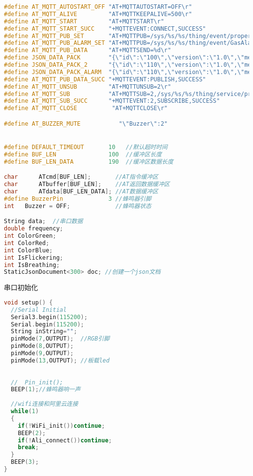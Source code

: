 \documentclass[12pt,hyperref,a4paper,UTF8]{ctexart}
\begin{document}
\begin{lstlisting}[language=C++]
#define AT_MQTT_AUTOSTART_OFF "AT+MQTTAUTOSTART=OFF\r"
#define AT_MQTT_ALIVE         "AT+MQTTKEEPALIVE=500\r"
#define AT_MQTT_START         "AT+MQTTSTART\r"
#define AT_MQTT_START_SUCC    "+MQTTEVENT:CONNECT,SUCCESS"
#define AT_MQTT_PUB_SET       "AT+MQTTPUB=/sys/%s/%s/thing/event/property/post,1\r"
#define AT_MQTT_PUB_ALARM_SET "AT+MQTTPUB=/sys/%s/%s/thing/event/GasAlarm/post,1\r"
#define AT_MQTT_PUB_DATA      "AT+MQTTSEND=%d\r"
#define JSON_DATA_PACK        "{\"id\":\"100\",\"version\":\"1.0\",\"method\":\"thing.event.property.post\",\"params\":{\"RoomTemp\":%d.%02d,\"AC\":%d,\"Fan\":%d,\"Buzzer\":%d,\"GasDetector\":%d}}\r"
#define JSON_DATA_PACK_2      "{\"id\":\"110\",\"version\":\"1.0\",\"method\":\"thing.event.property.post\",\"params\":{\"LightDetector\":%d,\"Curtain\":%d,\"Light\":%d,\"SoilHumi\":%d,\"Pump\":%d,\"eCO2\":%d,\"TVOC\":%d}}\r"
#define JSON_DATA_PACK_ALARM  "{\"id\":\"110\",\"version\":\"1.0\",\"method\":\"thing.event.GasAlarm.post\",\"params\":{\"GasDetector\":%d}}\r"
#define AT_MQTT_PUB_DATA_SUCC "+MQTTEVENT:PUBLISH,SUCCESS"
#define AT_MQTT_UNSUB         "AT+MQTTUNSUB=2\r"
#define AT_MQTT_SUB           "AT+MQTTSUB=2,/sys/%s/%s/thing/service/property/set,1\r"
#define AT_MQTT_SUB_SUCC      "+MQTTEVENT:2,SUBSCRIBE,SUCCESS"
#define AT_MQTT_CLOSE          "AT+MQTTCLOSE\r"

#define AT_BUZZER_MUTE           "\"Buzzer\":2"


#define DEFAULT_TIMEOUT       10   //默认超时时间
#define BUF_LEN               100  //缓冲区长度
#define BUF_LEN_DATA          190  //缓冲区数据长度

char      ATcmd[BUF_LEN];       //AT指令缓冲区
char      ATbuffer[BUF_LEN];    //AT返回数据缓冲区
char      ATdata[BUF_LEN_DATA]; //AT数据缓冲区
#define BuzzerPin             3 //蜂鸣器引脚
int   Buzzer = OFF;             //蜂鸣器状态

String data;  //串口数据
double frequency; 
int ColorGreen;
int ColorRed; 
int ColorBlue; 
int IsFlickering;
int IsBreathing;
StaticJsonDocument<300> doc; //创建一个json文档
\end{lstlisting}

串口初始化
\begin{lstlisting}[language=C++]
    void setup() {
  //Serial Initial
  Serial3.begin(115200);
  Serial.begin(115200);
  String inString="";
  pinMode(7,OUTPUT);  //RGB引脚
  pinMode(8,OUTPUT); 
  pinMode(9,OUTPUT); 
  pinMode(13,OUTPUT); //板载led
  
  
  //  Pin_init();
  BEEP(1);//蜂鸣器响一声
  
  //wifi连接和阿里云连接
  while(1)
  {
    if(!WiFi_init())continue;
    BEEP(2);
    if(!Ali_connect())continue;
    break;
  }
  BEEP(3);
}
\end{lstlisting}
\end{document}
